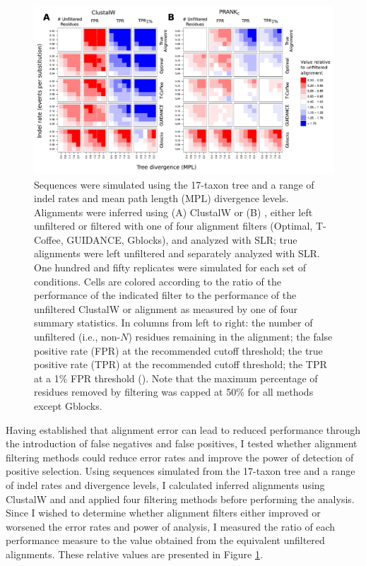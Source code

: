 \begin{figure}[t!]
\centering
\includegraphics[scale=0.65]{Figs/fig5.pdf}
\caption{Sequences were simulated using the 17-taxon tree and a range
  of indel rates and mean path length (MPL) divergence
  levels. Alignments were inferred using (A) ClustalW or (B) \prankc,
  either left unfiltered or filtered with one of four alignment
  filters (Optimal, T-Coffee, GUIDANCE, Gblocks), and analyzed with
  SLR; true alignments were left unfiltered and separately analyzed
  with SLR. One hundred and fifty replicates were simulated for each
  set of conditions. Cells are colored according to the ratio of the
  performance of the indicated filter to the performance of the
  unfiltered ClustalW or \prankc alignment as measured by one of four
  summary statistics. In columns from left to right: the number of
  unfiltered (i.e., non-$N$) residues remaining in the alignment; the
  false positive rate (FPR) at the recommended cutoff threshold; the
  true positive rate (TPR) at the recommended cutoff threshold; the
  TPR at a 1\% FPR threshold (\tpr). Note that the maximum percentage
  of residues removed by filtering was capped at 50\% for all methods
  except Gblocks.}
\label{fig_5}
\end{figure}

Having established that alignment error can lead to reduced \sw
performance through the introduction of false negatives and false
positives, I tested whether alignment filtering methods could reduce
error rates and improve the power of \sw detection of positive
selection. Using sequences simulated from the 17-taxon tree and a
range of indel rates and divergence levels, I calculated inferred
alignments using ClustalW and \prankc and applied four filtering
methods before performing the \sw analysis. Since I wished to
determine whether alignment filters either improved or worsened the
error rates and power of \sw analysis, I measured the ratio of each
performance measure to the value obtained from the equivalent
unfiltered alignments. These relative values are presented in Figure
\ref{fig_5}. 

